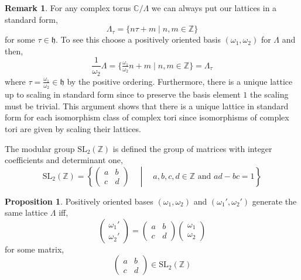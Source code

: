 \documentclass{article}
\newcommand{\SL}[0]{\mathrm{SL}}
\newcommand{\Z}{\mathbb{Z}}
\newcommand{\C}{\mathbb{C}}
\theoremstyle{definition}
\newtheorem{proposition}[theorem]{Proposition}
\newtheorem{remark}{Remark}[section]
\newenvironment{definition}[1][Definition:]{\begin{trivlist}
\item[\hskip \labelsep {\bfseries #1}]}{\end{trivlist}}
\newcommand{\h}{\mathfrak{h}}
\newcommand{\MG}{\SL_2(\Z)}
\begin{document}
\begin{remark}
For any complex torus $\C / \Lambda$ we can always put our lattices in a standard form, 
\[ \Lambda_\tau = \{ n \tau + m \mid n,m \in \Z \} \]
for some $\tau \in \h$. To see this choose a positively oriented basis $(\omega_1, \omega_2)$ for $\Lambda$ and then,
\[ \frac{1}{\omega_2} \Lambda = \{ \tfrac{\omega_1}{\omega_2} n + m \mid n, m \in \Z \}  = \Lambda_{\tau} \]
where $\tau = \frac{\omega_1}{\omega_2} \in \h$ by the positive ordering. Furthermore, there is a unique lattice up to scaling in standard form since to preserve the basis element $1$ the scaling must be trivial. This argument shows that there is a unique lattice in standard form for each isomorphism class of complex tori since isomorphisms of complex tori are given by scaling their lattices. 
\end{remark}

\begin{definition}
The modular group $\MG$ is defined the group of matrices with integer coefficients and determinant one,
\[ \MG = \left\{ \begin{pmatrix}
a & b 
\\
c & d
\end{pmatrix} \quad \middle| \quad a,b,c,d \in \Z \text{ and } ad - bc = 1  \right\} \]
\end{definition}

\begin{proposition}
Positively oriented bases $(\omega_1, \omega_2)$ and $(\omega_1', \omega_2')$ generate the same lattice $\Lambda$ iff,
\[ \begin{pmatrix}
\omega_1'
\\
\omega_2' 
\end{pmatrix}
=
\begin{pmatrix}
a & b 
\\
c & d
\end{pmatrix}
 \begin{pmatrix}
\omega_1
\\
\omega_2
\end{pmatrix} \]
for some matrix,
\[ \begin{pmatrix}
a & b 
\\
c & d
\end{pmatrix} \in \MG \]
\end{proposition}
\end{document}

